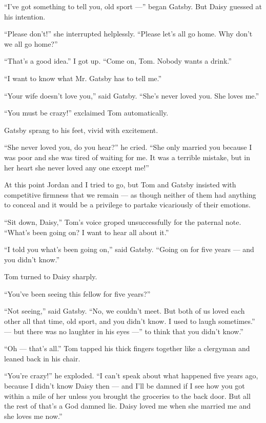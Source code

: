 \documentclass{znotebook}
\begin{document}
``I've got something to tell you, old sport ---'' began Gatsby. But Daisy guessed at his intention.

``Please don't!'' she interrupted helplessly. ``Please let's all go home. Why don't we all go home?''

``That's a good idea.'' I got up. ``Come on, Tom. Nobody wants a drink.''

``I want to know what Mr. Gatsby has to tell me.''

``Your wife doesn't love you,'' said Gatsby. ``She's never loved you. She loves me.''

``You must be crazy!'' exclaimed Tom automatically.

Gatsby sprang to his feet, vivid with excitement.

``She never loved you, do you hear?'' he cried. ``She only married you because I was poor and she was tired of waiting for me. It was a terrible mistake, but in her heart she never loved any one except me!''

At this point Jordan and I tried to go, but Tom and Gatsby insisted with competitive firmness that we remain ---{} as though neither of them had anything to conceal and it would be a privilege to partake vicariously of their emotions.

``Sit down, Daisy,'' Tom's voice groped unsuccessfully for the paternal note. ``What's been going on? I want to hear all about it.''

``I told you what's been going on,'' said Gatsby. ``Going on for five years ---{} and you didn't know.''

Tom turned to Daisy sharply.

``You've been seeing this fellow for five years?''

``Not seeing,'' said Gatsby. ``No, we couldn't meet. But both of us loved each other all that time, old sport, and you didn't know. I used to laugh sometimes.'' ---{} but there was no laughter in his eyes ---'' to think that you didn't know.''

``Oh ---{} that's all.'' Tom tapped his thick fingers together like a clergyman and leaned back in his chair.

``You're crazy!'' he exploded. ``I can't speak about what happened five years ago, because I didn't know Daisy then ---{} and I'll be damned if I see how you got within a mile of her unless you brought the groceries to the back door. But all the rest of that's a God damned lie. Daisy loved me when she married me and she loves me now.''
\end{document}
